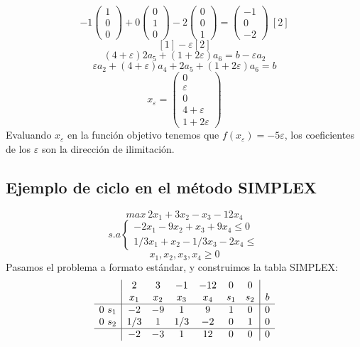 \documentclass[11pt,fleqn]{book} %
\begin{document}
$$-1 \left(\begin{array}{c}
1 \\ 0 \\ 0
\end{array}\right)+0\left(\begin{array}{c}
0 \\ 1 \\ 0
\end{array}\right)-2\left(\begin{array}{c}
0 \\ 0 \\ 1
\end{array}\right)=\left(\begin{array}{c}
-1 \\ 0 \\ -2
\end{array}\right) ~ [2]$$
$$[1]-\varepsilon[2]$$
$$(4+\varepsilon)2a_5+(1+2\varepsilon)a_6=b-\varepsilon a_2 $$
$$ \varepsilon a_2 + (4+\varepsilon)a_4+2a_5+(1+2\varepsilon)a_6=b$$
$$ x_\varepsilon=\left(\begin{array}{c}
0 \\ \varepsilon \\ 0 \\ 4 + \varepsilon \\ 1 + 2\varepsilon
\end{array}\right)$$
Evaluando $x_\varepsilon$ en la función objetivo tenemos que $f(x_\varepsilon)=-5 \varepsilon$, los coeficientes de los $\varepsilon$ son la dirección de ilimitación.

\subsection{Ejemplo de ciclo en el método SIMPLEX}
$$ max ~2x_1+3x_2-x_3-12x_4$$
$$s.a \left\{
\begin{array}{c}
-2x_1-9x_2+x_3+9x_4 \leq 0 \\
1/3x_1+x_2-1/3x_3-2x_4 \leq 
\end{array}
\right.
$$
$$x_1, x_2, x_3, x_4 \geq 0$$
Pasamos el problema a formato estándar, y construimos la tabla SIMPLEX:
$$
\begin{array}{c|cccccc|c}
& 2 & 3 & -1 & -12 & 0 & 0 & \\
& x_1 & x_2 & x_3 & x_4 & s_1 & s_2 & b \\ \hline
0 ~ s_1 & -2 & -9 & 1 & 9 & 1 & 0 & 0 \\
0 ~ s_2 & 1/3 & 1 & 1/3 & -2 & 0 & 1 & 0 \\ \hline
& -2 & -3 & 1 & 12 & 0 & 0 & 0
\end{array}
$$
\end{document}
